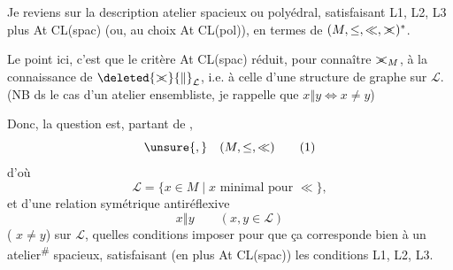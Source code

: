 Je reviens sur la description  atelier spacieux ou polyédral, satisfaisant L1, L2, L3 plus  At CL(spac) (ou, au choix At CL(pol)), en termes de $(M,\leq,\ll,\mathrel{>\mkern-10mu<})^{*}$.

Le point ici, c'est que le critère At CL(spac) réduit, pour connaître \({\mathrel{>\mkern-10mu<}}_M\), à la connaissance de $\deleted{\mathrel{>\mkern-10mu<}}{\Vert}_{\mathcal L}$, i.e. à celle d'une structure de graphe sur $\mathcal L$. (NB ds le cas d'un atelier ensembliste, je rappelle que $x\mathrel{\Vert}y\Longleftrightarrow x\neq y$)

Donc, la question est, partant de , 
\[
\unsure{,}\quad(M,\leq,\ll)\tag*{(1)}
\]
d'où
\[
\mathcal L=\{x\in M\mid x\text{ minimal pour }\ll\},\tag*{(2)}
\]
et d'une relation symétrique antiréflexive
\[
x\mathrel{\Vert}y\qquad(x,y\in\mathcal L)
\]
( $x\neq y$) sur $\mathcal L$, quelles conditions imposer pour que ça corresponde bien à un atelier\textsuperscript{\#} spacieux, satisfaisant  (en plus At CL(spac)) les conditions L1, L2, L3.

